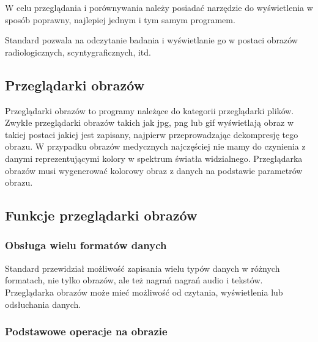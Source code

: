 
\par
W celu przeglądania i porównywania należy posiadać narzędzie do wyświetlenia w sposób poprawny, najlepiej jednym i tym samym programem.
\par
Standard \DICOM pozwala na odczytanie badania i wyświetlanie go w postaci obrazów radiologicznych, scyntygraficznych, itd.

\subsection{Przeglądarki obrazów}

Przeglądarki obrazów to programy należące do kategorii przeglądarki plików.
Zwykłe przeglądarki obrazów takich jak jpg, png lub gif wyświetlają obraz w takiej postaci jakiej jest zapisany, najpierw przeprowadzając dekompresję tego obrazu.
W przypadku obrazów medycznych najczęściej nie mamy do czynienia z danymi reprezentującymi kolory w spektrum światła widzialnego.
Przeglądarka obrazów \DICOM musi wygenerować kolorowy obraz z danych na podstawie parametrów obrazu.

\subsection{Funkcje przeglądarki obrazów}

\subsubsection{Obsługa wielu formatów danych}

Standard \DICOM przewidział możliwość zapisania wielu typów danych w różnych formatach, nie tylko obrazów, ale też nagrań nagrań audio i tekstów.
Przeglądarka obrazów \DICOM może mieć możliwość od czytania, wyświetlenia lub odsłuchania danych.

\subsubsection{Podstawowe operacje na obrazie}

